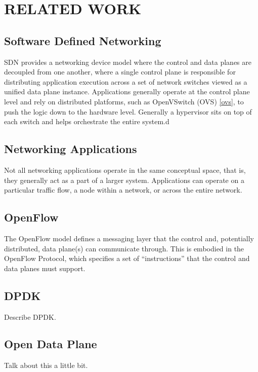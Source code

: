 \chapter{RELATED WORK}
\label{related}

\section{Software Defined Networking}
\label{related:sdn}
SDN provides a networking device model where the control and data planes are decoupled from one another, where a single control plane is responsible for distributing application execution across a set of network switches viewed as a unified data plane instance. Applications generally operate at the control plane level and rely on distributed platforms, such as OpenVSwitch (OVS) \ref{ovs}, to push the logic down to the hardware level. Generally a hypervisor sits on top of each switch and helps orchestrate the entire system.d


\section{Networking Applications}
\label{related:apps}
Not all networking applications operate in the same conceptual space, that is, they generally act as a part of a larger system. Applications can operate on a particular traffic flow, a node within a network, or across the entire network.

\section{OpenFlow}
\label{related:of}
The OpenFlow model defines a messaging layer that the control and, potentially distributed, data plane(s) can communicate through. This is embodied in the OpenFlow Protocol, which specifies a set of ``instructions'' that the control and data planes must support. 

\section{DPDK}
\label{related:dpdk}
Describe DPDK.

\section{Open Data Plane}
\label{related:odp}
Talk about this a little bit.

